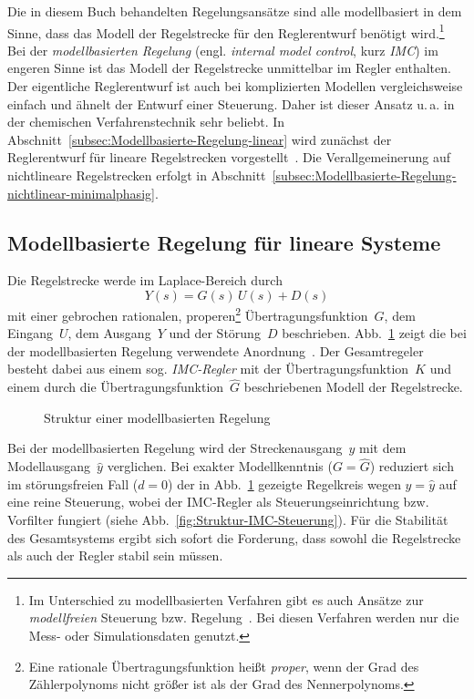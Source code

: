 Die in diesem Buch behandelten Regelungsansätze sind alle modellbasiert
in dem Sinne, dass das Modell der Regelstrecke für den Reglerentwurf
benötigt wird.\footnote{Im Unterschied zu modellbasierten Verfahren gibt es auch Ansätze zur
\emph{modellfreien} Steuerung bzw. Regelung~\cite{fliess2009}. Bei
diesen Verfahren werden nur die Mess- oder Simulationsdaten genutzt.} Bei der \emph{modellbasierten Regelung}
(engl. \emph{internal model control}, kurz \emph{IMC}) im engeren
Sinne ist das Modell der Regelstrecke unmittelbar im Regler enthalten.
Der eigentliche Reglerentwurf ist auch bei komplizierten Modellen
vergleichsweise einfach und ähnelt der Entwurf einer Steuerung. Daher
ist dieser Ansatz u.\,a. in der chemischen Verfahrenstechnik sehr
beliebt. In Abschnitt~\ref{subsec:Modellbasierte-Regelung-linear}
wird zunächst der Reglerentwurf für lineare Regelstrecken vorgestellt~\cite{garcia1982}.
Die Verallgemeinerung auf nichtlineare Regelstrecken erfolgt in Abschnitt~\ref{subsec:Modellbasierte-Regelung-nichtlinear-minimalphasig}.

\subsection{Modellbasierte Regelung für lineare Systeme\label{subsec:Modellbasierte-Regelung-linear}}

Die Regelstrecke werde im Laplace-Bereich durch 
\[
Y(s)=G(s)\,U(s)+D(s)
\]
mit einer gebrochen rationalen, properen\footnote{Eine rationale Übertragungsfunktion heißt \emph{proper}, wenn der
Grad des Zählerpolynoms nicht größer ist als der Grad des Nennerpolynoms.} Übertragungsfunktion~$G$, dem Eingang~$U$, dem Ausgang~$Y$
und der Störung~$D$ beschrieben. Abb.~\ref{fig:Struktur-IMC-linear}
zeigt die bei der modellbasierten Regelung verwendete Anordnung~\cite{lunze2007}.
Der Gesamtregeler besteht dabei aus einem sog. \emph{IMC-Regler} mit
der Übertragungsfunktion~$K$ und einem durch die Übertragungsfunktion~$\hat{G}$
beschriebenen Modell der Regelstrecke.
\begin{figure}
\begin{centering}
\resizebox{0.75\textwidth}{!}{}
\par\end{centering}
\caption{Struktur einer modellbasierten Regelung\label{fig:Struktur-IMC-linear}}
\end{figure}

Bei der modellbasierten Regelung wird der Streckenausgang~$y$ mit
dem Modellausgang~$\hat{y}$ verglichen. Bei exakter Modellkenntnis
($G=\hat{G}$) reduziert sich im störungsfreien Fall ($d=0$) der
in Abb.~\ref{fig:Struktur-IMC-linear} gezeigte Regelkreis wegen
$y=\hat{y}$ auf eine reine Steuerung, wobei der IMC-Regler als Steuerungseinrichtung
bzw. Vorfilter fungiert (siehe Abb.~\ref{fig:Struktur-IMC-Steuerung}).
Für die Stabilität des Gesamtsystems ergibt sich sofort die Forderung,
dass sowohl die Regelstrecke als auch der Regler stabil sein müssen. 

